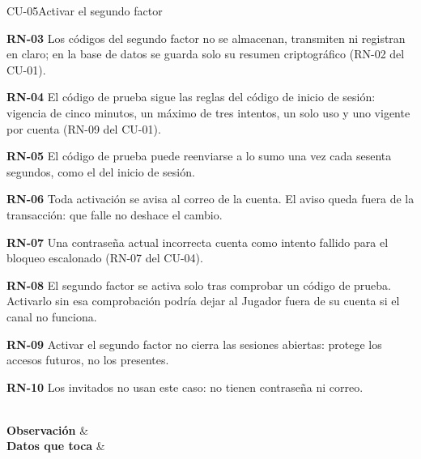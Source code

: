 \begin{fichacu}{CU-05}{Activar el segundo factor}
{\begin{cureglas}
      \item \textbf{\mbox{RN-03}} Los códigos del segundo factor no se almacenan, transmiten ni registran en claro; en la base de datos se guarda solo su resumen criptográfico (\mbox{RN-02} del \mbox{CU-01}).
      \item \textbf{\mbox{RN-04}} El código de prueba sigue las reglas del código de inicio de sesión: vigencia de cinco minutos, un máximo de tres intentos, un solo uso y uno vigente por cuenta (\mbox{RN-09} del \mbox{CU-01}).
      \item \textbf{\mbox{RN-05}} El código de prueba puede reenviarse a lo sumo una vez cada sesenta segundos, como el del inicio de sesión.
      \item \textbf{\mbox{RN-06}} Toda activación se avisa al correo de la cuenta. El aviso queda fuera de la transacción: que falle no deshace el cambio.
      \item \textbf{\mbox{RN-07}} Una contraseña actual incorrecta cuenta como intento fallido para el bloqueo escalonado (\mbox{RN-07} del \mbox{CU-04}).
      \item \textbf{\mbox{RN-08}} El segundo factor se activa solo tras comprobar un código de prueba. Activarlo sin esa comprobación podría dejar al Jugador fuera de su cuenta si el canal no funciona.
      \item \textbf{\mbox{RN-09}} Activar el segundo factor no cierra las sesiones abiertas: protege los accesos futuros, no los presentes.
      \item \textbf{\mbox{RN-10}} Los invitados no usan este caso: no tienen contraseña ni correo.
    \end{cureglas}} \\ \hline
  \textbf{Observación} &  \\ \hline
  \textbf{Datos que toca} & 
\end{fichacu}

